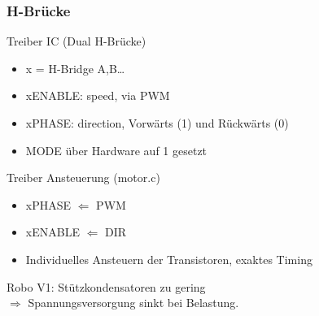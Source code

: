 \documentclass{beamer}
\begin{document}
\begin{frame}
	\frametitle{H-Brücke}

	\begin{block}{Treiber IC (Dual H-Brücke) }
		\begin{itemize}
			\item{x = H-Bridge A,B\dots}
			\item{xENABLE: speed, via PWM}
			\item{xPHASE: direction, Vorwärts (1) und Rückwärts (0)}
			\item{MODE über Hardware auf 1 gesetzt}
		\end{itemize}
	\end{block}


	\begin{block}{Treiber Ansteuerung (motor.c)}
		 \begin{itemize}
	 		\item{xPHASE $\Leftarrow$ PWM}
	 		\item{xENABLE $\Leftarrow$ DIR}
	 		\item{Individuelles Ansteuern der Transistoren, exaktes Timing}
		 \end{itemize}
	\end{block}


	\begin{alertblock}{}
		Robo V1: Stützkondensatoren zu gering\\
		$\Rightarrow$ Spannungsversorgung sinkt bei Belastung.
	\end{alertblock}
\end{frame}
\end{document}

